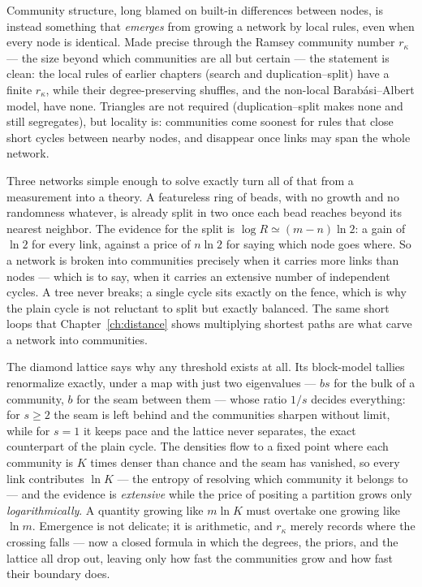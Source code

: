 Community structure, long blamed on built-in differences between nodes, is
instead something that \emph{emerges} from growing a network by local rules, even
when every node is identical. Made precise through the Ramsey community number
$r_\kappa$ --- the size beyond which communities are all but certain --- the
statement is clean: the local rules of earlier chapters (search and
duplication--split) have a finite $r_\kappa$, while their
degree-preserving shuffles, and the non-local Barab\'asi--Albert model, have none.
Triangles are not required (duplication--split makes none and still segregates),
but locality is: communities come soonest for rules that close short cycles
between nearby nodes, and disappear once links may span the whole network.

Three networks simple enough to solve exactly turn all of that from a measurement
into a theory. A featureless ring of beads, with no growth and no randomness
whatever, is already split in two once each bead reaches beyond its nearest
neighbor. The evidence for the split is $\log R\simeq(m-n)\ln 2$: a
gain of $\ln 2$ for every link, against a price of $n\ln 2$ for saying which node
goes where. So a network is broken into communities precisely when it carries more
links than nodes --- which is to say, when it carries an extensive number of
independent cycles. A tree never breaks; a single cycle sits exactly on the fence,
which is why the plain cycle is not reluctant to split but exactly balanced. The
same short loops that Chapter~\ref{ch:distance} shows multiplying shortest paths
are what carve a network into communities.

The diamond lattice says why any threshold exists at all. Its block-model tallies
renormalize exactly, under a map with just two eigenvalues --- $bs$ for the bulk of
a community, $b$ for the seam between them --- whose ratio $1/s$ decides
everything: for $s\ge2$ the seam is left behind and the communities sharpen without
limit, while for $s=1$ it keeps pace and the lattice never separates, the exact
counterpart of the plain cycle. The densities flow to a fixed point where each
community is $K$ times denser than chance and the seam has vanished, so every link
contributes $\ln K$ --- the entropy of resolving which community it belongs to ---
and the evidence is \emph{extensive} while the price of positing a partition grows
only \emph{logarithmically}. A quantity growing like $m\ln K$ must overtake one
growing like $\ln m$. Emergence is not delicate; it is arithmetic, and $r_\kappa$
merely records where the crossing falls --- now a closed formula in which the
degrees, the priors, and the lattice all drop out, leaving only how fast the
communities grow and how fast their boundary does.

